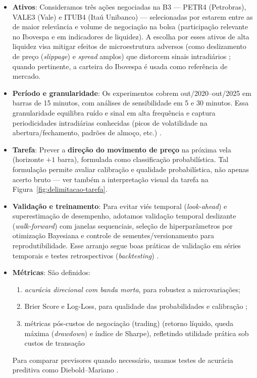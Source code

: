 \begin{itemize}
    \item \textbf{Ativos}: Consideramos três ações negociadas na B3 — PETR4 (Petrobras), VALE3 (Vale) e ITUB4 (Itaú Unibanco) — selecionadas por estarem entre as de maior relevância e volume de negociação na bolsa (participação relevante no Ibovespa e em indicadores de liquidez). A escolha por esses ativos de alta liquidez visa mitigar efeitos de microestrutura adversos (como deslizamento de preço (\textit{slippage}) e \textit{spread} amplos) que distorcem sinais intradiários \cite{hasbrouck2007empirical}; quando pertinente, a carteira do Ibovespa é usada como referência de mercado.
    
    \item \textbf{Período e granularidade}: Os experimentos cobrem out/2020–out/2025 em barras de 15 minutos, com análises de sensibilidade em 5 e 30 minutos. Essa granularidade equilibra ruído e sinal em alta frequência e captura periodicidades intradiárias conhecidas (picos de volatilidade na abertura/fechamento, padrões de almoço, etc.) \cite{andersen1997intraday,hyndman_2018}. 
    
    \item \textbf{Tarefa}: Prever a \textbf{direção do movimento de preço} na próxima vela (horizonte $+1$ barra), formulada como classificação probabilística. Tal formulação permite avaliar calibração e qualidade probabilística, não apenas acerto bruto \cite{brier1950,guo2017} — ver também a interpretação visual da tarefa na Figura~\ref{fig:delimitacao-tarefa}.

    \item \textbf{Validação e treinamento}: Para evitar viés temporal (\textit{look-ahead}) e superestimação de desempenho, adotamos validação temporal deslizante (\textit{walk-forward}) com janelas sequenciais, seleção de hiperparâmetros por otimização Bayesiana e controle de sementes/versionamento para reprodutibilidade. Esse arranjo segue boas práticas de validação em séries temporais e testes retrospectivos (\textit{backtesting}) \cite{bergmeir2012,lopezdeprado2018}.

\item \textbf{Métricas}: São definidos:
\begin{enumerate}[label=\Roman*.]
    \item \emph{acurácia direcional com banda morta}, para robustez a microvariações;
    \item Brier Score e Log-Loss, para qualidade das probabilidades e calibração \cite{brier1950,guo2017};
    \item métricas pós-custos de negociação (trading) (retorno líquido, queda máxima (\textit{drawdown}) e índice de Sharpe), refletindo utilidade prática sob custos de transação \cite{sharpe1994}
\end{enumerate}
Para comparar previsores quando necessário, usamos testes de acurácia preditiva como Diebold–Mariano \cite{diebold1995}.



\end{itemize}

